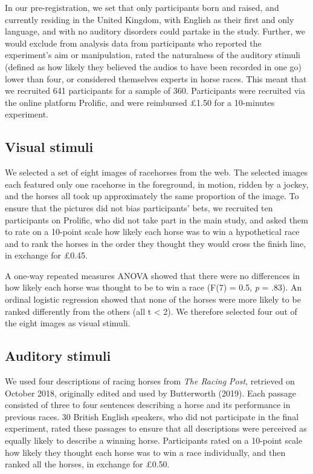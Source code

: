 \documentclass[
  man,floatsintext]{apa6}
\begin{document}
In our pre-registration, we set that only participants born and raised, and currently residing in the United Kingdom, with English as their first and only language, and with no auditory disorders could partake in the study. Further, we would exclude from analysis data from participants who reported the experiment's aim or manipulation, rated the naturalness of the auditory stimuli (defined as how likely they believed the audios to have been recorded in one go) lower than four, or considered themselves experts in horse races. This meant that we recruited 641 participants for a sample of 360. Participants were recruited via the online platform Prolific, and were reimbursed £1.50 for a 10-minutes experiment.

\hypertarget{visual-stimuli}{%
\subsection{Visual stimuli}\label{visual-stimuli}}

We selected a set of eight images of racehorses from the web. The selected images each featured only one racehorse in the foreground, in motion, ridden by a jockey, and the horses all took up approximately the same proportion of the image. To ensure that the pictures did not bias participants' bets, we recruited ten participants on Prolific, who did not take part in the main study, and asked them to rate on a 10-point scale how likely each horse was to win a hypothetical race and to rank the horses in the order they thought they would cross the finish line, in exchange for £0.45.

A one-way repeated measures ANOVA showed that there were no differences in how likely each horse was thought to be to win a race (F(7) = 0.5, \emph{p} = .83). An ordinal logistic regression showed that none of the horses were more likely to be ranked differently from the others (all \textbar t\textbar{} \textless{} 2). We therefore selected four out of the eight images as visual stimuli.

\hypertarget{auditory-stimuli}{%
\subsection{Auditory stimuli}\label{auditory-stimuli}}

We used four descriptions of racing horses from \emph{The Racing Post}, retrieved on October 2018, originally edited and used by Butterworth (2019). Each passage consisted of three to four sentences describing a horse and its performance in previous races. 30 British English speakers, who did not participate in the final experiment, rated these passages to ensure that all descriptions were perceived as equally likely to describe a winning horse. Participants rated on a 10-point scale how likely they thought each horse was to win a race individually, and then ranked all the horses, in exchange for £0.50.
\end{document}
